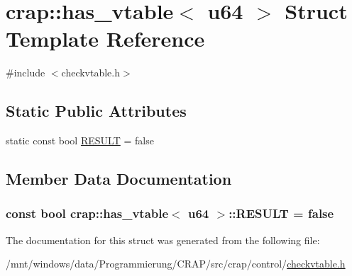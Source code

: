 \hypertarget{structcrap_1_1has__vtable_3_01u64_01_4}{\section{crap\-:\-:has\-\_\-vtable$<$ u64 $>$ Struct Template Reference}
\label{structcrap_1_1has__vtable_3_01u64_01_4}
}


{\ttfamily \#include $<$checkvtable.\-h$>$}

\subsection*{Static Public Attributes}
\begin{DoxyCompactItemize}
\item 
static const bool \hyperlink{structcrap_1_1has__vtable_3_01u64_01_4_a1e6518eb5d447cc59d70934dfa7d3af1}{R\-E\-S\-U\-L\-T} = false
\end{DoxyCompactItemize}


\subsection{Member Data Documentation}
\hypertarget{structcrap_1_1has__vtable_3_01u64_01_4_a1e6518eb5d447cc59d70934dfa7d3af1}{
\subsubsection[{R\-E\-S\-U\-L\-T}]{\setlength{\rightskip}{0pt plus 5cm}const bool {\bf crap\-::has\-\_\-vtable}$<$ {\bf u64} $>$\-::R\-E\-S\-U\-L\-T = false\hspace{0.3cm}{\ttfamily [static]}}}\label{structcrap_1_1has__vtable_3_01u64_01_4_a1e6518eb5d447cc59d70934dfa7d3af1}


The documentation for this struct was generated from the following file\-:\begin{DoxyCompactItemize}
\item 
/mnt/windows/data/\-Programmierung/\-C\-R\-A\-P/src/crap/control/\hyperlink{checkvtable_8h}{checkvtable.\-h}\end{DoxyCompactItemize}
